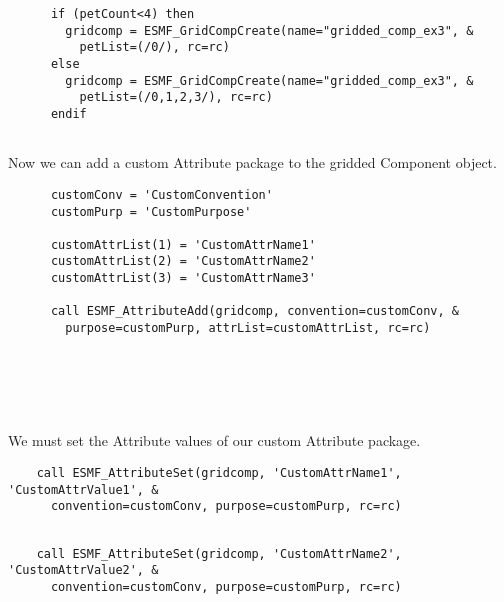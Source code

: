 \begin{verbatim}
      if (petCount<4) then
        gridcomp = ESMF_GridCompCreate(name="gridded_comp_ex3", &
          petList=(/0/), rc=rc)
      else 
        gridcomp = ESMF_GridCompCreate(name="gridded_comp_ex3", &
          petList=(/0,1,2,3/), rc=rc)
      endif
 
\end{verbatim}
 

      Now we can add a custom Attribute package to the gridded Component object. 

 \begin{verbatim}
      customConv = 'CustomConvention'
      customPurp = 'CustomPurpose'

      customAttrList(1) = 'CustomAttrName1'
      customAttrList(2) = 'CustomAttrName2'
      customAttrList(3) = 'CustomAttrName3'

      call ESMF_AttributeAdd(gridcomp, convention=customConv, &
        purpose=customPurp, attrList=customAttrList, rc=rc)

 
\end{verbatim}
 

 \begin{verbatim}

 
\end{verbatim}
 

       We must set the Attribute values of our custom Attribute package. 

 \begin{verbatim}
    call ESMF_AttributeSet(gridcomp, 'CustomAttrName1', 'CustomAttrValue1', &
      convention=customConv, purpose=customPurp, rc=rc)
 
\end{verbatim}
 

 \begin{verbatim}
    call ESMF_AttributeSet(gridcomp, 'CustomAttrName2', 'CustomAttrValue2', &
      convention=customConv, purpose=customPurp, rc=rc)
 
\end{verbatim}
 

